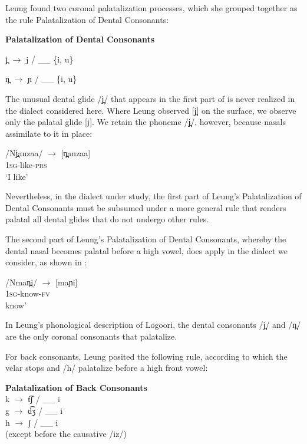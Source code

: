 \documentclass[output=paper]{langsci/langscibook}
\begin{document}
Leung found two coronal palatalization processes, which she grouped together as the rule Palatalization of Dental Consonants:


\ea{}

\textbf{Palatalization of Dental Consonants} \citep[117]{Leung1991}




j̪ $\rightarrow$ j / \_\_ \{i, u\}

n̪ $\rightarrow$ ɲ / \_\_ \{i, u\}
\z


The unusual dental glide /j̪/ that appears in the first part of  is never realized in the dialect considered here. Where Leung observed [j̪] on the surface, we observe only the palatal glide [j]. We retain the phoneme /j̪/, however, because nasals assimilate to it in place:

\ea{}
 /Nj̪anzaa/  $\rightarrow$  [n̪anzaa]  \\{}
\textsc{1sg}{}-like-\textsc{prs}\\{}
\glt ‘I like’
\z

Nevertheless, in the dialect under study, the first part of Leung’s Palatalization of Dental Consonants must be subsumed under a more general rule that renders palatal all dental glides that do not undergo other rules.

The second part of Leung’s Palatalization of Dental Consonants, whereby the dental nasal becomes palatal before a high vowel, does apply in the dialect we consider, as shown in :


\ea\label{ex:glewwe:3}{}
 /Nman̪i/  $\rightarrow$  [maɲi]   \\{} 
\textsc{1sg}-know-\textsc{fv}\\{}
 know’
\z

In Leung’s phonological description of Logoori, the dental consonants /j̪/ and /n̪/ are the only coronal consonants that palatalize.    

For back consonants, Leung posited the following rule, according to which the velar stops and /h/ palatalize before a high front vowel:


\ea{}
\textbf{Palatalization of Back Consonants} \citep[116]{Leung1991}\\{}
k $\rightarrow$ t͡ʃ / \_\_ i
\\{}
g $\rightarrow$ d͡ʒ / \_\_ i
\\{}
h $\rightarrow$ ʃ / \_\_ i      
\\{}
(except before the causative /iz/)
\z
\end{document}
